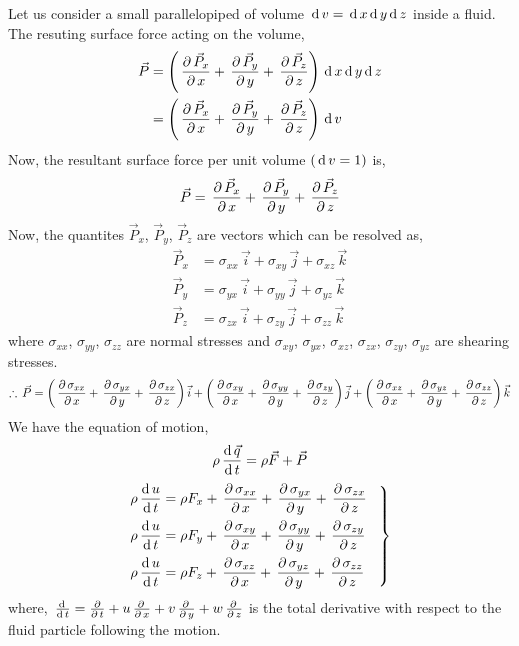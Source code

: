 \documentclass[../main-sheet.tex]{subfiles}
\begin{document}
\begin{soln}
    Let us consider a small parallelopiped of volume \(\,\mathrm{d}\, v=\,\mathrm{d}\, x\,\mathrm{d}\, y\,\mathrm{d}\, z\) inside a fluid. The resuting surface force acting on the volume,
    \begin{align*}
        \vec{P}&=\left( \,\frac{\partial\, \vec{P}_x}{\partial\, x}+\,\frac{\partial\, \vec{P}_y}{\partial\, y}+\,\frac{\partial\, \vec{P}_z}{\partial\, z} \right)\,\mathrm{d}\, x\,\mathrm{d}\, y\,\mathrm{d}\, z\\
        &=\left( \,\frac{\partial\, \vec{P}_x}{\partial\, x}+\,\frac{\partial\, \vec{P}_y}{\partial\, y}+\,\frac{\partial\, \vec{P}_z}{\partial\, z} \right)\,\mathrm{d}\, v
    \end{align*}
    Now, the resultant surface force per unit volume \((\,\mathrm{d}\, v=1)\) is,
    \[
        \vec{P}=\,\frac{\partial\, \vec{P}_x}{\partial\, x}+\,\frac{\partial\, \vec{P}_y}{\partial\, y}+\,\frac{\partial\, \vec{P}_z}{\partial\, z}
    \]
    Now, the quantites \(\vec{P}_x\), \(\vec{P}_y\), \(\vec{P}_z\) are vectors which can be resolved as,
    \begin{align*}
        \vec{P}_x&=\sigma_{xx}\,\vec{i}+\sigma_{xy}\,\vec{j}+\sigma_{xz}\,\vec{k}\\
        \vec{P}_y&=\sigma_{yx}\,\vec{i}+\sigma_{yy}\,\vec{j}+\sigma_{yz}\,\vec{k}\\
        \vec{P}_z&=\sigma_{zx}\,\vec{i}+\sigma_{zy}\,\vec{j}+\sigma_{zz}\,\vec{k}
    \end{align*}
    where \(\sigma_{xx}\), \(\sigma_{yy}\), \(\sigma_{zz}\) are normal stresses and \(\sigma_{xy}\), \(\sigma_{yx}\), \(\sigma_{xz}\), \(\sigma_{zx}\), \(\sigma_{zy}\), \(\sigma_{yz}\) are shearing stresses.
    \[
        \therefore \,\vec{P}=
        \left( \,\frac{\partial\, \sigma_{xx}}{\partial\, x}+\,\frac{\partial\, \sigma_{yx}}{\partial\, y}+\,\frac{\partial\, \sigma_{zx}}{\partial\, z} \right)\vec{i}+
        \left( \,\frac{\partial\, \sigma_{xy}}{\partial\, x}+\,\frac{\partial\, \sigma_{yy}}{\partial\, y}+\,\frac{\partial\, \sigma_{zy}}{\partial\, z} \right)\vec{j}+
        \left( \,\frac{\partial\, \sigma_{xz}}{\partial\, x}+\,\frac{\partial\, \sigma_{yz}}{\partial\, y}+\,\frac{\partial\, \sigma_{zz}}{\partial\, z} \right)\vec{k}
    \]
    We have the equation of motion,
    \[\rho\,\frac{\mathrm{d}\,\vec{q}}{\mathrm{d}\,t}=\rho\vec{F}+\vec{P}\]
\begin{equation}
    \begin{rcases}
        \displaystyle\rho\,\frac{\mathrm{d}\,u}{\mathrm{d}\,t}=\rho F_x+\,\frac{\partial\, \sigma_{xx}}{\partial\, x}+\,\frac{\partial\, \sigma_{yx}}{\partial\, y}+\,\frac{\partial\, \sigma_{zx}}{\partial\, z}\\
        \displaystyle\rho\,\frac{\mathrm{d}\,u}{\mathrm{d}\,t}=\rho F_y+\,\frac{\partial\, \sigma_{xy}}{\partial\, x}+\,\frac{\partial\, \sigma_{yy}}{\partial\, y}+\,\frac{\partial\, \sigma_{zy}}{\partial\, z}\\
        \displaystyle\rho\,\frac{\mathrm{d}\,u}{\mathrm{d}\,t}=\rho F_z+\,\frac{\partial\, \sigma_{xz}}{\partial\, x}+\,\frac{\partial\, \sigma_{yz}}{\partial\, y}+\,\frac{\partial\, \sigma_{zz}}{\partial\, z}\quad
    \end{rcases}\label{eq:navier1}
\end{equation}
where, \(\,\frac{\mathrm{d}\,}{\mathrm{d}\,t}=\frac{\partial}{\partial\,t}+u\,\frac{\partial\, }{\partial\, x}+v\,\frac{\partial\, }{\partial\, y}+w\,\frac{\partial\, }{\partial\, z}\) is the total derivative with respect to the fluid particle following the motion.\\



\end{soln}
\end{document}

